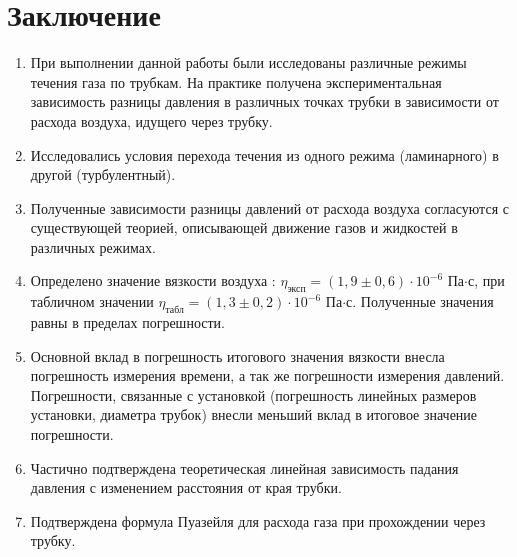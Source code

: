\documentclass[12pt,a4paper]{article}
\begin{document}
\section{Заключение}

\begin{enumerate}
	\item При выполнении данной работы были исследованы различные режимы течения газа по трубкам. На практике получена экспериментальная зависимость разницы давления в различных точках трубки в зависимости от расхода воздуха, идущего через трубку.
	\item Исследовались условия перехода течения из одного режима (ламинарного) в другой (турбулентный).
	\item Полученные зависимости разницы давлений от расхода воздуха согласуются с существующей теорией, описывающей движение газов и жидкостей в различных режимах.
	\item Определено значение вязкости воздуха : $\eta_{\text{эксп}} = \left(1,9 \pm 0,6\right) \cdot 10^{-6}$ Па$\cdot$с, при табличном значении $\eta_{\text{табл}} = \left(1,3 \pm 0,2\right) \cdot 10^{-6}$ Па$\cdot$с. Полученные значения равны в пределах погрешности.
	\item Основной вклад в погрешность итогового значения вязкости внесла погрешность измерения времени, а так же погрешности измерения давлений. Погрешности, связанные с установкой (погрешность линейных размеров установки, диаметра трубок) внесли меньший вклад в итоговое значение погрешности.
	\item Частично подтверждена теоретическая линейная зависимость падания давления с изменением расстояния от края трубки.
	\item Подтверждена формула Пуазейля для расхода газа при прохождении через трубку.
\end{enumerate}
\end{document}
